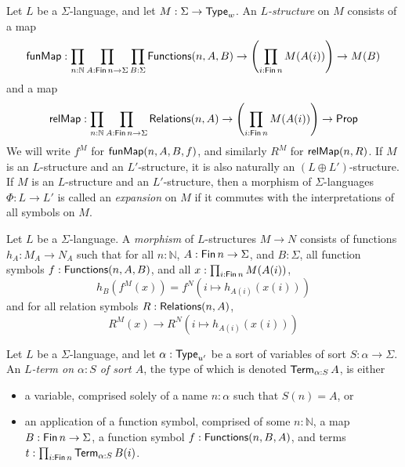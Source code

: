 \begin{definition}
  Let \( L \) be a \( \Sigma \)-language, and let \( M : \Sigma \to \mathsf{Type}_w \).
  An \emph{\( L \)-structure} on \( M \) consists of a map
  \[ \operatorname{\mathsf{funMap}} : \prod_{n : \mathbb N} \prod_{A : \operatorname{\mathsf{Fin}} n \to \Sigma} \prod_{B : \Sigma} \operatorname{\mathsf{Functions}}(n, A, B) \to \left(\prod_{i : \operatorname{\mathsf{Fin}} n} M(A(i)) \right) \to M(B) \]
  and a map
  \[ \operatorname{\mathsf{relMap}} : \prod_{n : \mathbb N} \prod_{A : \operatorname{\mathsf{Fin}} n \to \Sigma} \operatorname{\mathsf{Relations}}(n, A) \to \left(\prod_{i : \operatorname{\mathsf{Fin}} n} M(A(i)) \right) \to \mathsf{Prop} \]
  We will write \( f^M \) for \( \operatorname{\mathsf{funMap}}(n, A, B, f) \), and similarly \( R^M \) for \( \operatorname{\mathsf{relMap}}(n, R) \).
  If \( M \) is an \( L \)-structure and an \( L' \)-structure, it is also naturally an \( (L \oplus L') \)-structure.
  If \( M \) is an \( L \)-structure and an \( L' \)-structure, then a morphism of \( \Sigma \)-languages \( \Phi : L \to L' \) is called an \emph{expansion} on \( M \) if it commutes with the interpretations of all symbols on \( M \).
\end{definition}
\begin{definition}
  Let \( L \) be a \( \Sigma \)-language.
  A \emph{morphism} of \( L \)-structures \( M \to N \) consists of functions \( h_A : M_A \to N_A \) such that for all \( n : \mathbb N \), \( A : \operatorname{\mathsf{Fin}} n \to \Sigma \), and \( B : \Sigma \), all function symbols \( f : \operatorname{\mathsf{Functions}}(n, A, B) \), and all \( x : \prod_{i : \operatorname{\mathsf{Fin}} n} M(A(i)) \),
  \[ h_B(f^M(x)) = f^N(i \mapsto h_{A(i)}(x(i))) \]
  and for all relation symbols \( R : \operatorname{\mathsf{Relations}}(n, A) \),
  \[ R^M(x) \to R^N(i \mapsto h_{A(i)}(x(i))) \]
\end{definition}
\begin{definition}
  Let \( L \) be a \( \Sigma \)-language, and let \( \alpha : \mathsf{Type}_{u'} \) be a sort of variables of sort \( S : \alpha \to \Sigma \).
  An \emph{\( L \)-term on \( \alpha : S \) of sort \( A \)}, the type of which is denoted \( \operatorname{\mathsf{Term}}_{\alpha:S} A \), is either
  \begin{itemize}
    \item a variable, comprised solely of a name \( n : \alpha \) such that \( S(n) = A \), or
    \item an application of a function symbol, comprised of some \( n : \mathbb N \), a map \( B : \operatorname{\mathsf{Fin}} n \to \Sigma \), a function symbol \( f : \operatorname{\mathsf{Functions}}(n, B, A) \), and terms \( t : \prod_{i : \operatorname{\mathsf{Fin}} n} \operatorname{\mathsf{Term}}_{\alpha:S} B(i) \).
  \end{itemize}
\end{definition}
